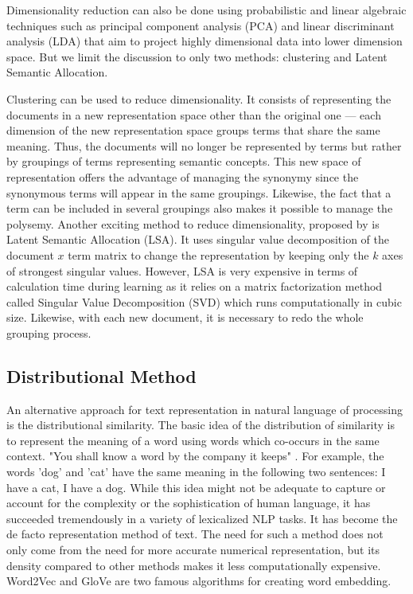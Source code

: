 Dimensionality reduction can also be done using probabilistic and linear algebraic techniques such as principal component analysis (PCA) and linear discriminant analysis (LDA) that aim to project highly dimensional data into lower dimension space. But we limit the discussion to only two methods: clustering and Latent Semantic Allocation. 

Clustering \citep{baker1998distributional} \citep{sable2001using} \citep{slonim2001power} can be used to reduce dimensionality. It consists of representing the documents in a new representation space other than the original one — each dimension of the new representation space groups terms that share the same meaning. Thus, the documents will no longer be represented by terms but rather by groupings of terms representing semantic concepts. This new space of representation offers the advantage of managing the synonymy since the synonymous terms will appear in the same groupings. Likewise, the fact that a term can be included in several groupings also makes it possible to manage the polysemy. Another exciting method to reduce dimensionality, proposed by \citep{deerwester1990indexing} is Latent Semantic Allocation (LSA). It uses singular value decomposition of the document $x$ term matrix to change the representation by keeping only the $k$ axes of strongest singular values. However, LSA is very expensive in terms of calculation time during learning as it relies on a matrix factorization method called Singular Value Decomposition (SVD) which runs computationally in cubic size. Likewise, with each new document, it is necessary to redo the whole grouping process.

\subsection{Distributional Method}
An alternative approach for text representation in natural language of processing is the distributional similarity. The basic idea of the distribution of similarity is to represent the meaning of a word using words which co-occurs in the same context. "You shall know a word by the company it keeps" \citep{firth1957synopsis}. For example, the words 'dog' and 'cat' have the same meaning in the following two sentences: I have a cat, I have a dog. While this idea might not be adequate to capture or account for the complexity or the sophistication of human language, it has succeeded tremendously in a variety of lexicalized NLP tasks. It has become the de facto representation method of text. The need for such a method does not only come from the need for more accurate numerical representation, but its density compared to other methods makes it less computationally expensive. Word2Vec \citep{mikolov2013distributed} and GloVe \citep{pennington2014glove} are two famous algorithms for creating word embedding. 

